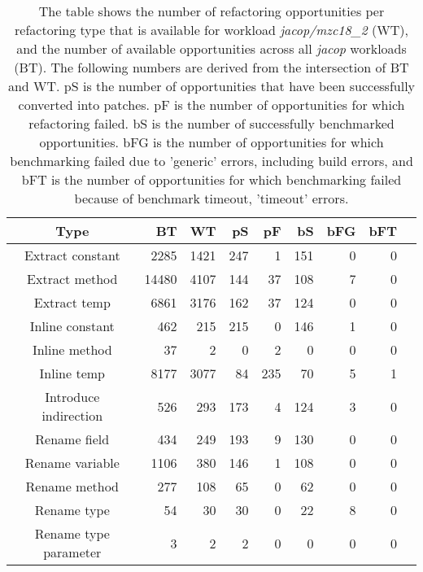 \begin{table}[!h]
\caption{The table shows the number of refactoring opportunities per refactoring type that is available for workload \textit{jacop/mzc18\_2} (WT), and the number of available opportunities across all \textit{jacop} workloads (BT). The following numbers are derived from the intersection of BT and WT. pS is the number of opportunities that have been successfully converted into patches. pF is the number of opportunities for which refactoring failed. bS is the number of successfully benchmarked opportunities. bFG is the number of opportunities for which benchmarking failed due to 'generic' errors, including build errors, and bFT is the number of opportunities for which benchmarking failed because of benchmark timeout, 'timeout' errors.}
\begin{tabular}{c|*{7}{r}r}
Type&BT&WT&pS&pF&bS&bFG&bFT\\
\hline
Extract constant&2285&1421&247&1&151&0&0\\
Extract method&14480&4107&144&37&108&7&0\\
Extract temp&6861&3176&162&37&124&0&0\\
Inline constant&462&215&215&0&146&1&0\\
Inline method&37&2&0&2&0&0&0\\
Inline temp&8177&3077&84&235&70&5&1\\
Introduce indirection&526&293&173&4&124&3&0\\
Rename field&434&249&193&9&130&0&0\\
Rename variable&1106&380&146&1&108&0&0\\
Rename method&277&108&65&0&62&0&0\\
Rename type&54&30&30&0&22&8&0\\
Rename type parameter&3&2&2&0&0&0&0\\
\end{tabular}
\end{table}
